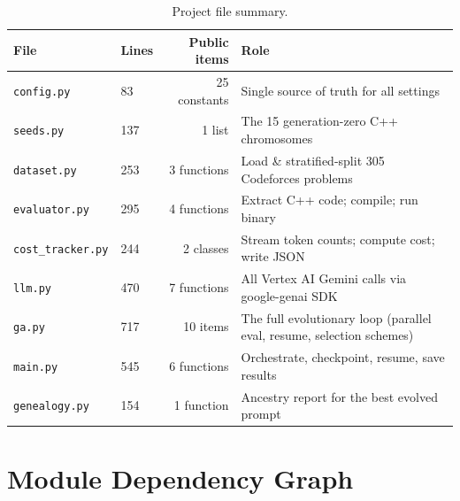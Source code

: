\documentclass[11pt,a4paper]{report}
\newcommand{\pyfile}[1]{\texttt{#1}}
\begin{document}
\begin{table}[h]
\centering
\begin{tabular}{@{}llrp{5.5cm}@{}}
\toprule
\textbf{File} & \textbf{Lines} & \textbf{Public items} & \textbf{Role} \\
\midrule
\pyfile{config.py}        & 83  & 25 constants  & Single source of truth for all settings \\
\pyfile{seeds.py}         & 137 & 1 list        & The 15 generation-zero C++ chromosomes \\
\pyfile{dataset.py}       & 253 & 3 functions   & Load \& stratified-split 305 Codeforces problems \\
\pyfile{evaluator.py}     & 295 & 4 functions   & Extract C++ code; compile; run binary \\
\pyfile{cost\_tracker.py} & 244 & 2 classes     & Stream token counts; compute cost; write JSON \\
\pyfile{llm.py}           & 470 & 7 functions   & All Vertex AI Gemini calls via google-genai SDK \\
\pyfile{ga.py}            & 717 & 10 items      & The full evolutionary loop (parallel eval, resume, selection schemes) \\
\pyfile{main.py}          & 545 & 6 functions   & Orchestrate, checkpoint, resume, save results \\
\pyfile{genealogy.py}     & 154 & 1 function    & Ancestry report for the best evolved prompt \\
\bottomrule
\end{tabular}
\caption{Project file summary.}
\end{table}

\section{Module Dependency Graph}
\end{document}
